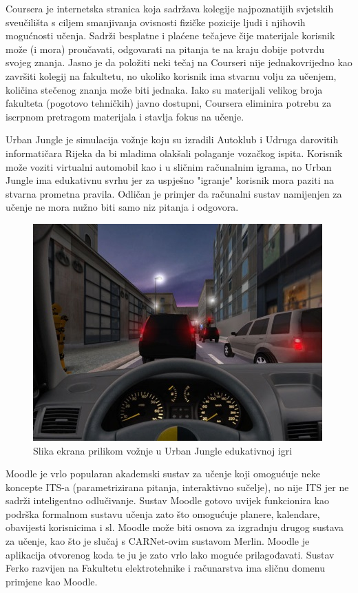 \documentclass[times, utf8, zavrsni]{fer}
\begin{document}
\par
Coursera je internetska stranica koja sadržava kolegije najpoznatijih svjetskih sveučilišta s ciljem smanjivanja ovisnosti fizičke pozicije ljudi i njihovih mogućnosti učenja. Sadrži besplatne i plaćene tečajeve čije materijale korisnik može (i mora) proučavati, odgovarati na pitanja te na kraju dobije potvrdu svojeg znanja. Jasno je da položiti neki tečaj na Courseri nije jednakovrijedno kao završiti kolegij na fakultetu, no ukoliko korisnik ima stvarnu volju za učenjem, količina stečenog znanja može biti jednaka. Iako su materijali velikog broja fakulteta (pogotovo tehničkih) javno dostupni, Coursera eliminira potrebu za iscrpnom pretragom materijala i stavlja fokus na učenje.
\par
Urban Jungle je simulacija vožnje koju su izradili Autoklub i Udruga darovitih informatičara Rijeka da bi mladima olakšali polaganje vozačkog ispita. Korisnik  može voziti virtualni automobil kao i u sličnim računalnim igrama, no Urban Jungle ima edukativnu svrhu jer za uspješno "igranje" korisnik mora paziti na stvarna prometna pravila. Odličan je primjer da računalni sustav namijenjen za učenje ne mora nužno biti samo niz pitanja i odgovora.

\begin{figure}[htb]
	\centering
	\includegraphics[]{img/urbjng.jpg}
	\caption{Slika ekrana prilikom vožnje u Urban Jungle edukativnoj igri}
	\label{fig:urbjng}
\end{figure}

\par
Moodle je vrlo popularan akademski sustav za učenje koji omogućuje neke koncepte ITS-a (parametrizirana pitanja, interaktivno sučelje), no nije ITS jer ne sadrži inteligentno odlučivanje. Sustav Moodle gotovo uvijek funkcionira kao podrška formalnom sustavu učenja zato što omogućuje planere, kalendare, obavijesti korisnicima i sl. Moodle može biti osnova za izgradnju drugog sustava za učenje, kao što je slučaj s CARNet-ovim sustavom Merlin. Moodle je aplikacija otvorenog koda te ju je zato vrlo lako moguće prilagođavati. Sustav Ferko razvijen na Fakultetu elektrotehnike i računarstva ima sličnu domenu primjene kao Moodle.
\end{document}
